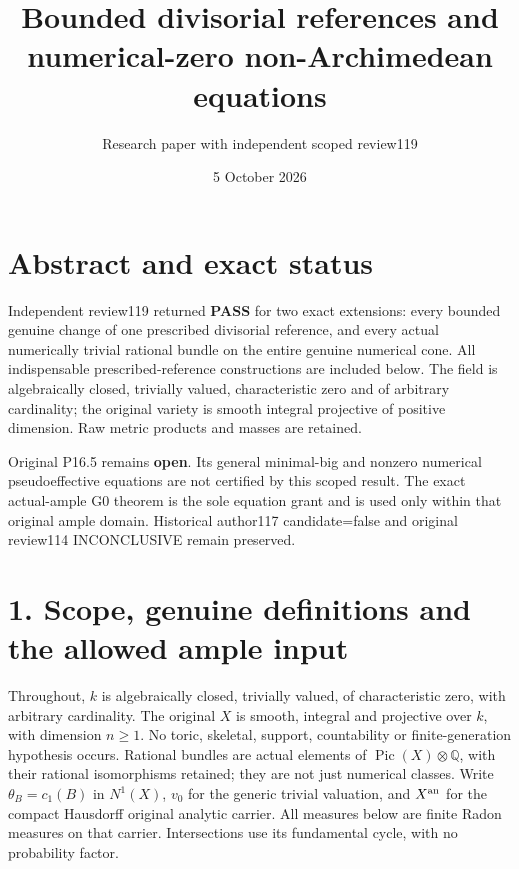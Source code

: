 \documentclass[
  10pt,
]{article}
\title{Bounded divisorial references and numerical-zero non-Archimedean
equations}
\author{Research paper with independent scoped review119}
\date{5 October 2026}
\begin{document}
\maketitle

\section{Abstract and exact status}\label{abstract-and-exact-status}

Independent review119 returned \textbf{PASS} for two exact extensions:
every bounded genuine change of one prescribed divisorial reference, and
every actual numerically trivial rational bundle on the entire genuine
numerical cone. All indispensable prescribed-reference constructions are
included below. The field is algebraically closed, trivially valued,
characteristic zero and of arbitrary cardinality; the original variety
is smooth integral projective of positive dimension. Raw metric products
and masses are retained.

Original P16.5 remains \textbf{open}. Its general minimal-big and
nonzero numerical pseudoeffective equations are not certified by this
scoped result. The exact actual-ample G0 theorem is the sole equation
grant and is used only within that original ample domain. Historical
author117 candidate=false and original review114 INCONCLUSIVE remain
preserved.

\section{1. Scope, genuine definitions and the allowed ample
input}\label{scope-genuine-definitions-and-the-allowed-ample-input}

Throughout, \(k\) is algebraically closed, trivially valued, of
characteristic zero, with arbitrary cardinality. The original \(X\) is
smooth, integral and projective over \(k\), with dimension \(n\geq1\).
No toric, skeletal, support, countability or finite-generation
hypothesis occurs. Rational bundles are actual elements of
\(\operatorname{Pic}(X)\otimes\mathbb Q\), with their rational
isomorphisms retained; they are not just numerical classes. Write
\(\theta_B=c_1(B)\) in \(N^1(X)\), \(v_0\) for the generic trivial
valuation, and \(X^{\rm an}\) for the compact Hausdorff original
analytic carrier. All measures below are finite Radon measures on that
carrier. Intersections use its fundamental cycle, with no probability
factor.
\end{document}
